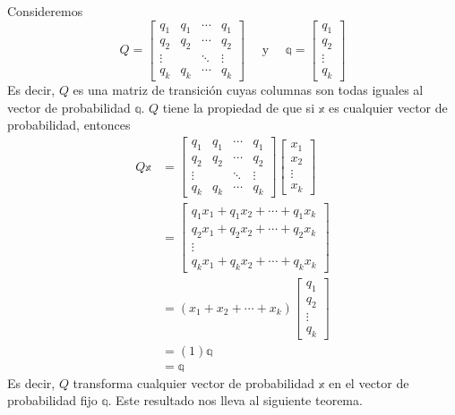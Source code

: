 Consideremos
$$Q = \begin{bmatrix}
    q_1 & q_1 & \cdots & q_1 \\
    q_2 & q_2 & \cdots & q_2 \\
    \vdots & & \ddots & \vdots \\
    q_k & q_k & \cdots & q_k
\end{bmatrix} \quad \text{ y } \quad \mathbb{q} = \begin{bmatrix}
    q_1 \\
    q_2 \\
    \vdots \\
    q_k
\end{bmatrix}$$
Es decir, $Q$ es una matriz de transición cuyas columnas son todas iguales al vector de probabilidad $\mathbb{q}$. $Q$ tiene la propiedad de que si $\mathbb{x}$ es cualquier vector de probabilidad, entonces
\begin{align*}
    Q\mathbb{x} & = \begin{bmatrix}
        q_1 & q_1 & \cdots & q_1 \\
        q_2 & q_2 & \cdots & q_2 \\
        \vdots & & \ddots & \vdots \\
        q_k & q_k & \cdots & q_k
    \end{bmatrix} \begin{bmatrix}
        x_1 \\
        x_2 \\
        \vdots \\
        x_k
    \end{bmatrix} \\
    & = \begin{bmatrix}
        q_1x_1 + q_1x_2 + \cdots + q_1x_k \\
        q_2x_1 + q_2x_2 + \cdots + q_2x_k \\
        \vdots \\
        q_kx_1 + q_kx_2 + \cdots + q_kx_k
    \end{bmatrix} \\
    & = (x_1 + x_2 + \cdots + x_k) \begin{bmatrix}
        q_1 \\
        q_2 \\
        \vdots \\
        q_k
    \end{bmatrix} \\
    & = (1) \mathbb{q} \\
    & = \mathbb{q}
\end{align*}
Es decir, $Q$ transforma cualquier vector de probabilidad $\mathbb{x}$ en el vector de probabilidad fijo $\mathbb{q}$. Este resultado nos lleva al siguiente teorema.

